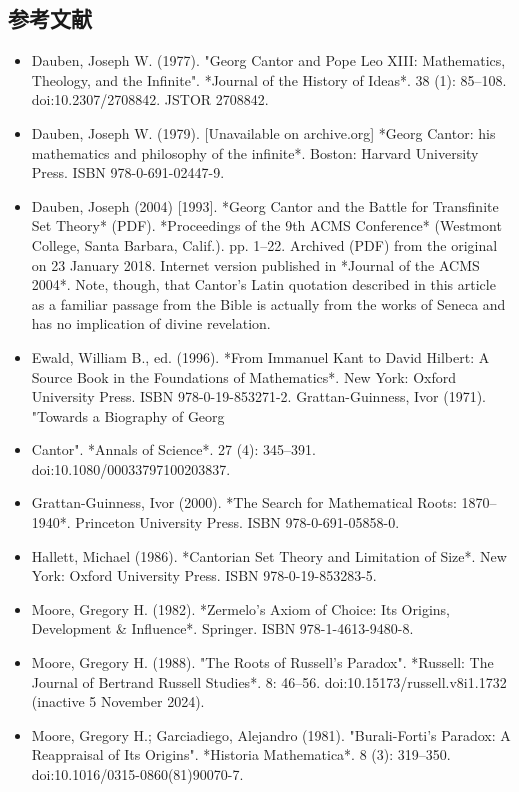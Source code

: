 \subsection{参考文献}  
\begin{itemize}
\item Dauben, Joseph W. (1977). "Georg Cantor and Pope Leo XIII: Mathematics, Theology, and the Infinite". *Journal of the History of Ideas*. 38 (1): 85–108. doi:10.2307/2708842. JSTOR 2708842.  
\item Dauben, Joseph W. (1979). [Unavailable on archive.org] *Georg Cantor: his mathematics and philosophy of the infinite*. Boston: Harvard University Press. ISBN 978-0-691-02447-9.  
\item Dauben, Joseph (2004) [1993]. *Georg Cantor and the Battle for Transfinite Set Theory* (PDF). *Proceedings of the 9th ACMS Conference* (Westmont College, Santa Barbara, Calif.). pp. 1–22. Archived (PDF) from the original on 23 January 2018. Internet version published in *Journal of the ACMS 2004*. Note, though, that Cantor's Latin quotation described in this article as a familiar passage from the Bible is actually from the works of Seneca and has no implication of divine revelation.  
\item Ewald, William B., ed. (1996). *From Immanuel Kant to David Hilbert: A Source Book in the Foundations of Mathematics*. New York: Oxford University Press. ISBN 978-0-19-853271-2.  
Grattan-Guinness, Ivor (1971). "Towards a Biography of Georg \item Cantor". *Annals of Science*. 27 (4): 345–391. doi:10.1080/00033797100203837.  
\item Grattan-Guinness, Ivor (2000). *The Search for Mathematical Roots: 1870–1940*. Princeton University Press. ISBN 978-0-691-05858-0.  
\item Hallett, Michael (1986). *Cantorian Set Theory and Limitation of Size*. New York: Oxford University Press. ISBN 978-0-19-853283-5.  
\item Moore, Gregory H. (1982). *Zermelo's Axiom of Choice: Its Origins, Development & Influence*. Springer. ISBN 978-1-4613-9480-8.  
\item Moore, Gregory H. (1988). "The Roots of Russell's Paradox". *Russell: The Journal of Bertrand Russell Studies*. 8: 46–56. doi:10.15173/russell.v8i1.1732 (inactive 5 November 2024).  
\item Moore, Gregory H.; Garciadiego, Alejandro (1981). "Burali-Forti's Paradox: A Reappraisal of Its Origins". *Historia Mathematica*. 8 (3): 319–350. doi:10.1016/0315-0860(81)90070-7.  

\end{itemize}
